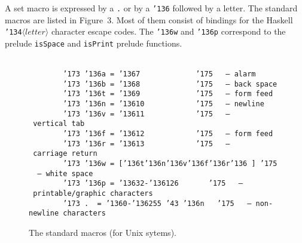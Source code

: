 A set macro is expressed by a \mbox{\tt .} or by a \mbox{\tt {\char'136}} followed by a letter.  The
standard macros are listed in Figure~3.  Most of them consist of bindings for
the Haskell \mbox{\tt {\char'134}}$\langle letter \rangle$ character escape codes.  The \mbox{\tt {\char'136}w} and
\mbox{\tt {\char'136}p} correspond to the prelude \mbox{\tt isSpace} and \mbox{\tt isPrint} prelude functions.
\begin{figure} \mbox{\tt }\\
\mbox{\tt \ \ \ \ \ \ \ \ {\char'173}\ {\char'136}a\ =\ {\char'136}7\ \ \ \ \ \ \ \ \ \ \ \ \ {\char'175}\ \ \ --\ alarm}\\
\mbox{\tt \ \ \ \ \ \ \ \ {\char'173}\ {\char'136}b\ =\ {\char'136}8\ \ \ \ \ \ \ \ \ \ \ \ \ {\char'175}\ \ \ --\ back\ space}\\
\mbox{\tt \ \ \ \ \ \ \ \ {\char'173}\ {\char'136}t\ =\ {\char'136}9\ \ \ \ \ \ \ \ \ \ \ \ \ {\char'175}\ \ \ --\ form\ feed}\\
\mbox{\tt \ \ \ \ \ \ \ \ {\char'173}\ {\char'136}n\ =\ {\char'136}10\ \ \ \ \ \ \ \ \ \ \ \ {\char'175}\ \ \ --\ newline}\\
\mbox{\tt \ \ \ \ \ \ \ \ {\char'173}\ {\char'136}v\ =\ {\char'136}11\ \ \ \ \ \ \ \ \ \ \ \ {\char'175}\ \ \ --\ vertical\ tab}\\
\mbox{\tt \ \ \ \ \ \ \ \ {\char'173}\ {\char'136}f\ =\ {\char'136}12\ \ \ \ \ \ \ \ \ \ \ \ {\char'175}\ \ \ --\ form\ feed}\\
\mbox{\tt \ \ \ \ \ \ \ \ {\char'173}\ {\char'136}r\ =\ {\char'136}13\ \ \ \ \ \ \ \ \ \ \ \ {\char'175}\ \ \ --\ carriage\ return}\\
\mbox{\tt \ \ \ \ \ \ \ \ {\char'173}\ {\char'136}w\ =\ [{\char'136}t{\char'136}n{\char'136}v{\char'136}f{\char'136}r{\char'136}\ ]\ {\char'175}\ \ \ --\ white\ space}\\
\mbox{\tt \ \ \ \ \ \ \ \ {\char'173}\ {\char'136}p\ =\ {\char'136}32-{\char'136}126\ \ \ \ \ \ \ {\char'175}\ \ \ --\ printable/graphic\ characters}\\
\mbox{\tt \ \ \ \ \ \ \ \ {\char'173}\ .\ \ =\ {\char'136}0-{\char'136}255\ {\char'43}\ {\char'136}n\ \ \ {\char'175}\ \ \ --\ non-newline\ characters}
\caption{The standard macros (for Unix sytems).}\label{fig-standard-macros}
\end{figure}

